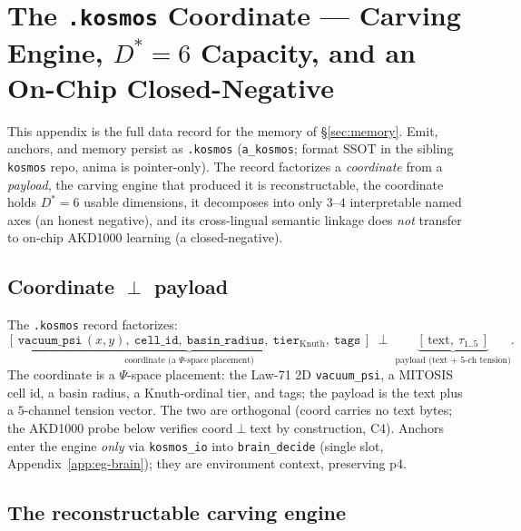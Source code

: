 \section{The \texttt{.kosmos} Coordinate --- Carving Engine, $D^\ast=6$ Capacity, and an On-Chip Closed-Negative}
\label{app:kosmos_coord}

This appendix is the full data record for the memory of \S\ref{sec:memory}. Emit,
anchors, and memory persist as \texttt{.kosmos} (\texttt{a\_kosmos}; format SSOT
in the sibling \texttt{kosmos} repo, anima is pointer-only). The record factorizes
a \emph{coordinate} from a \emph{payload}, the carving engine that produced it is
reconstructable, the coordinate holds $D^\ast=6$ usable dimensions, it decomposes
into only $3$--$4$ interpretable named axes (an honest negative), and its
cross-lingual semantic linkage does \emph{not} transfer to on-chip AKD1000
learning (a closed-negative).

\subsection{Coordinate $\perp$ payload}
\label{app:kosmos-factor}

The \texttt{.kosmos} record factorizes:
\begin{equation}
\underbrace{[\,\texttt{vacuum\_psi}\,(x,y),\ \texttt{cell\_id},\ \texttt{basin\_radius},\ \texttt{tier}_\text{Knuth},\ \texttt{tags}\,]}_{\text{coordinate (a $\Psi$-space placement)}}
\;\perp\;
\underbrace{[\,\text{text},\ \tau_{1..5}\,]}_{\text{payload (text + 5-ch tension)}} .
\label{eq:kosmos-factor}
\end{equation}
The coordinate is a $\Psi$-space placement: the Law-71 2D \texttt{vacuum\_psi},
a MITOSIS cell id, a basin radius, a Knuth-ordinal tier, and tags; the payload is
the text plus a $5$-channel tension vector. The two are orthogonal (coord carries
no text bytes; the AKD1000 probe below verifies coord$\perp$text by construction,
C4). Anchors enter the engine \emph{only} via \texttt{kosmos\_io} into
\texttt{brain\_decide} (single slot, Appendix~\ref{app:eg-brain}); they are
environment context, preserving p4.

\subsection{The reconstructable carving engine}
\label{app:kosmos-carve}

